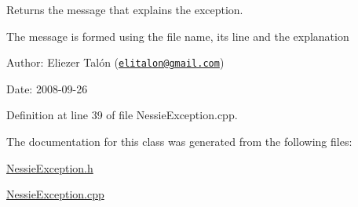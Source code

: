 Returns the message that explains the exception. 

The message is formed using the file name, its line and the explanation

\begin{Desc}
\item[Author:]Eliezer Talón (\href{mailto:elitalon@gmail.com}{\tt elitalon@gmail.com}) \end{Desc}
\begin{Desc}
\item[Date:]2008-09-26 \end{Desc}


Definition at line 39 of file NessieException.cpp.

The documentation for this class was generated from the following files:\begin{CompactItemize}
\item 
\hyperlink{_nessie_exception_8h}{NessieException.h}\item 
\hyperlink{_nessie_exception_8cpp}{NessieException.cpp}\end{CompactItemize}
